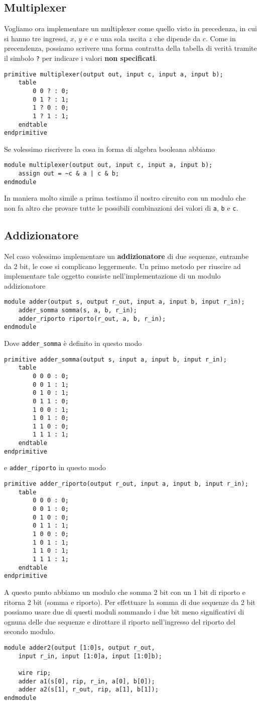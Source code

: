 \subsection{Multiplexer}
Vogliamo ora implementare un multiplexer come quello visto in precedenza, in cui si hanno tre
ingressi, $x$, $y$ e $c$ e una sola uscita $z$ che dipende da $c$. Come in precendenza, possiamo
scrivere una forma contratta della tabella di verità tramite il simbolo \verb|?| per indicare i
valori \textbf{non specificati}.
\begin{verbatim}
primitive multiplexer(output out, input c, input a, input b);
	table
		0 0 ? : 0;
		0 1 ? : 1;
		1 ? 0 : 0;
		1 ? 1 : 1;
	endtable
endprimitive
\end{verbatim}
Se volessimo riscrivere la cosa in forma di algebra booleana abbiamo
\begin{verbatim}
module multiplexer(output out, input c, input a, input b);
	assign out = ~c & a | c & b;
endmodule
\end{verbatim}
In maniera molto simile a prima testiamo il nostro circuito con un modulo che non fa altro che
provare tutte le possibili combinazioni dei valori di \verb|a|, \verb|b| e \verb|c|.

\subsection{Addizionatore}
Nel caso volessimo implementare un \textbf{addizionatore} di due sequenze, entrambe da 2 bit, le
cose si complicano leggermente. Un primo metodo per riuscire ad implementare tale oggetto consiste
nell'implementazione di un modulo addizionatore
\begin{verbatim}
module adder(output s, output r_out, input a, input b, input r_in);
	adder_somma somma(s, a, b, r_in);
	adder_riporto riporto(r_out, a, b, r_in);
endmodule
\end{verbatim}
Dove \verb|adder_somma| è definito in questo modo
\begin{verbatim}
primitive adder_somma(output s, input a, input b, input r_in);
	table
		0 0 0 : 0;
		0 0 1 : 1;
		0 1 0 : 1;
		0 1 1 : 0;
		1 0 0 : 1;
		1 0 1 : 0;
		1 1 0 : 0;
		1 1 1 : 1;
	endtable
endprimitive
\end{verbatim}
e \verb|adder_riporto| in questo modo
\begin{verbatim}
primitive adder_riporto(output r_out, input a, input b, input r_in);
	table
		0 0 0 : 0;
		0 0 1 : 0;
		0 1 0 : 0;
		0 1 1 : 1;
		1 0 0 : 0;
		1 0 1 : 1;
		1 1 0 : 1;
		1 1 1 : 1;
	endtable
endprimitive
\end{verbatim}
A questo punto abbiamo un modulo che somma 2 bit con un 1 bit di riporto e ritorna 2 bit (somma e
riporto). Per effettuare la somma di due sequenze da 2 bit possiamo usare due di questi moduli
sommando i due bit meno significativi di ognuna delle due sequenze e dirottare il riporto
nell'ingresso del riporto del secondo modulo.
\begin{verbatim}
module adder2(output [1:0]s, output r_out,
	input r_in, input [1:0]a, input [1:0]b);
    
	wire rip;
    adder a1(s[0], rip, r_in, a[0], b[0]);
    adder a2(s[1], r_out, rip, a[1], b[1]);
endmodule
\end{verbatim}
